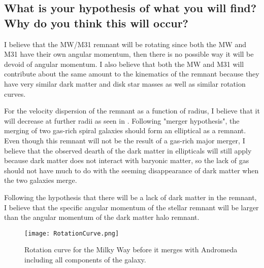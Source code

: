 \documentclass[twocolumn]{aastex63}
\begin{document}
\subsection{What is your hypothesis of what you will find? Why do you think this will occur?}

I believe that the MW/M31 remnant will be rotating since both the MW and M31 have their own angular momentum, then there is no possible way it will be devoid of angular momentum.  I also believe that both the MW and M31 will contribute about the same amount to the kinematics of the remnant because they have very similar dark matter and disk star masses as well as similar rotation curves.     

For the velocity dispersion of the remnant as a function of radius, I believe that it will decrease at further radii as seen in \cite{2003Sci...301.1696R}.  Following "merger hypothesis", the merging of two gas-rich spiral galaxies should form an elliptical as a remnant.  Even though this remnant will not be the result of a gas-rich major merger, I believe that the observed dearth of the dark matter in ellipticals will still apply because dark matter does not interact with baryonic matter, so the lack of gas should not have much to do with the seeming disappearance of dark matter when the two galaxies merge.

Following the hypothesis that there will be a lack of dark matter in the remnant, I believe that the specific angular momentum of the stellar remnant will be larger than the angular momentum of the dark matter halo remnant.


\vspace{3mm} %
\begin{figure}[h]
    \centering
    \texttt{[image: RotationCurve.png]}
    \caption{Rotation curve for the Milky Way before it merges with Andromeda including all components of the galaxy.}
    \label{fig:my_label}
\end{figure}


{}




\end{document}
